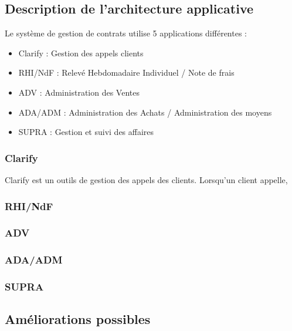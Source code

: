 \subsection{Description de l'architecture applicative}

Le système de gestion de contrats utilise 5 applications différentes :


\begin{itemize}
\item Clarify : Gestion des appels clients
\item RHI/NdF : Relevé Hebdomadaire Individuel / Note de frais
\item ADV : Administration des Ventes
\item ADA/ADM : Administration des Achats / Administration des moyens
\item SUPRA : Gestion et suivi des affaires
\end{itemize}


\subsubsection{Clarify}

Clarify est un outils de gestion des appels des clients. Lorsqu'un client appelle,  %

\subsubsection{RHI/NdF}
\subsubsection{ADV}
\subsubsection{ADA/ADM}
\subsubsection{SUPRA}

\subsection{Améliorations possibles}

